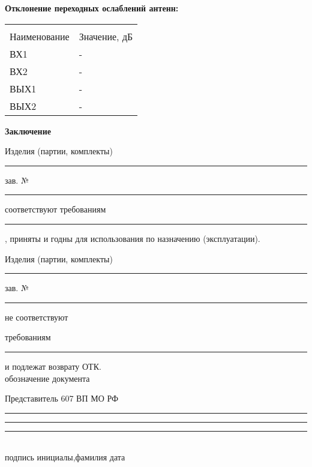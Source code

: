 \documentclass[a4paper, 8pt]{article}
\newcommand{\InputA}[1][-]{#1}
\newcommand{\InputB}[1][-]{#1}
\newcommand{\OutputA}[1][-]{#1}
\newcommand{\OutputB}[1][-]{#1}
\begin{document}
	
	


	\vspace{1.0cm} %
	\centering
	{ \textbf{Отклонение переходных ослаблений антенн:} \  }  
	\vspace{0.5cm}

		\begin{tabular}{| >{\centering\arraybackslash}m{8.5cm} | >{\centering\arraybackslash}m{8.5cm} |}\hline
			& \\ [-1em] %
			Наименование & Значение, дБ \\
			\hline	
			ВХ1 & \InputA \\
			\hline 
			ВХ2 & \InputB \\
			\hline 
			ВЫХ1 & \OutputA \\
			\hline  
			ВЫХ2 & \OutputB \\ 
			\hline 
			
		\end{tabular}
	
	
	\vspace{1.5cm} %
	\centering
	{ \large\textbf{Заключение} \  } 
	\vspace{1.0cm}
	
	 Изделия (партии, комплекты) \rule[+0.0mm]{2cm}{0.1mm}  \hsize  зав. №  \hsize \rule[+0.0mm]{6cm}{0.1mm}   соответствуют требованиям 
     \newline  %
    
     \rule[+0.0mm]{4cm}{0.1mm}, приняты и годны для использования по назначению (эксплуатации).
	 \newline  %

     Изделия (партии, комплекты) \rule[+0.0mm]{3cm}{0.1mm}  \hsize  зав. №  \hsize \rule[+0.0mm]{6cm}{0.1mm}  не соответствуют 
	 \newline  %
	
 	 требованиям \hsize \rule[+0.0mm]{6cm}{0.1mm} и подлежат возврату ОТК. \\
	 \hsize обозначение документа  
	 \newline   %

     Представитель 607 ВП МО РФ  \hsize \rule[+0.0mm]{2.6cm}{0.1mm}  \hsize \rule[+0.0mm]{4.3cm}{0.1mm}  \hsize \rule[+0.0mm]{2.5cm}{0.1mm}  \hsize \\
	
	 \hsize подпись \hsize инициалы,фамилия \hsize дата 

	  
\end{document}
